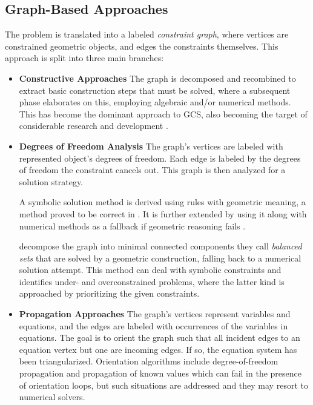 \subsection{Graph-Based Approaches}
\label{sec:intro.constraints.graph}
The problem is translated into a labeled \textit{constraint graph}, where
vertices are constrained geometric objects, and edges the constraints
themselves.  This approach is split into three main branches:
%
\begin{itemize}
  \item[] \textbf{Constructive Approaches} The graph is decomposed and
  recombined to extract basic construction steps that must be solved, where a
  subsequent phase elaborates on this, employing algebraic and/or numerical
  methods.  This has become the dominant approach to \ac{GCS}, also becoming the
  target of considerable research and development
  \cite{Bettig:2011:GCSPC:1.3593408}.
  
  \item[] \textbf{Degrees of Freedom Analysis} The graph's vertices are labeled
  with represented object's degrees of freedom.  Each edge is labeled by the
  degrees of freedom the constraint cancels out.  This graph is then analyzed
  for a solution strategy.
  
  A symbolic solution method is derived using rules with geometric meaning, a
  method proved to be correct in \cite{Kramer:1990:SGCS}.  It is further
  extended by using it along with numerical methods as a fallback if geometric
  reasoning fails \cite{Hsu:1997:HCSEIGC}.
  
  \citet{Latham:1996:CA} decompose the graph into minimal connected components
  they call \textit{balanced sets} that are solved by a geometric construction,
  falling back to a numerical solution attempt.  This method can deal with
  symbolic constraints and identifies under- and overconstrained problems, where
  the latter kind is approached by prioritizing the given constraints.
  
  \item[] \textbf{Propagation Approaches} The graph's vertices represent
  variables and equations, and the edges are labeled with occurrences of the
  variables in equations.  The goal is to orient the graph such that all
  incident edges to an equation vertex but one are incoming edges. If so, the
  equation system has been triangularized. Orientation algorithms include
  degree-of-freedom propagation and propagation of known values
  \cite{Freeman:1990:ICS,Veltkamp:1992:Geometric} which can fail in the presence
  of orientation loops, but such situations are addressed
  \cite{Veltkamp:1992:Geometric} and they may resort to numerical solvers.
\end{itemize}

